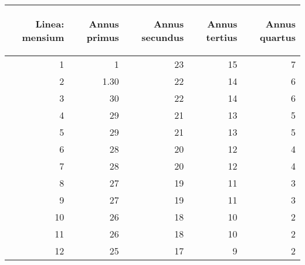 \begin{tabular}{| r | r | r | r | r |}
\hline
\begin{sideways}
Linea: mensium
\end{sideways}
&
\begin{sideways}
Annus primus
\end{sideways}
&
\begin{sideways}
Annus secundus
\end{sideways}
&
\begin{sideways}
Annus tertius
\end{sideways}
&
\begin{sideways}
Annus quartus
\end{sideways}
\\
\hline
  1 & 1    & 23 & 15 & 7
\\ \cline{2-5}
  2 & 1.30 & 22 & 14 & 6
\\ \cline{2-5}
  3 & 30   & 22 & 14 & 6
\\ \cline{2-5}
  4 & 29   & 21 & 13 & 5
\\ \cline{2-5}
  5 & 29   & 21 & 13 & 5
\\ \cline{2-5}
  6 & 28   & 20 & 12 & 4
\\ \cline{2-5}
  7 & 28   & 20 & 12 & 4
\\ \cline{2-5}
  8 & 27   & 19 & 11 & 3
\\ \cline{2-5}
  9 & 27   & 19 & 11 & 3
\\ \cline{2-5}
 10 & 26   & 18 & 10 & 2
\\ \cline{2-5}
 11 & 26   & 18 & 10 & 2
\\ \cline{2-5}
 12 & 25   & 17 &  9 & 2
\\
\hline
\end{tabular}
